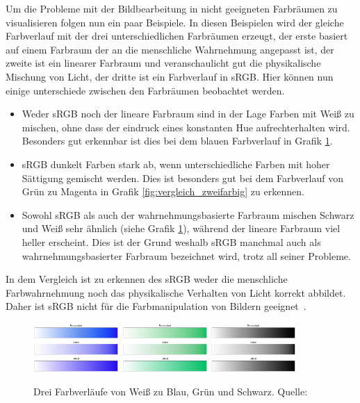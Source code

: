 \documentclass[12pt, a4paper, ngerman]{article}
\begin{document}
Um die Probleme mit der Bildbearbeitung in nicht geeigneten Farbräumen zu visualisieren folgen nun ein paar Beispiele. 
In diesen Beispielen wird der gleiche Farbverlauf mit der drei unterschiedlichen Farbräumen erzeugt, 
der erste basiert auf einem Farbraum der an die menschliche Wahrnehmung angepasst ist, 
der zweite ist ein linearer Farbraum und veranschaulicht gut die physikalische Mischung von Licht, 
der dritte ist ein Farbverlauf in sRGB.
Hier können nun einige unterschiede zwischen den Farbräumen beobachtet werden.
\begin{itemize}
  \item Weder sRGB noch der lineare Farbraum sind in der Lage Farben mit Weiß zu mischen, ohne dass der eindruck eines konstanten Hue aufrechterhalten wird. Besonders gut erkennbar ist dies bei dem blauen Farbverlauf in Grafik \ref{fig:vergleich_white}.
  \item sRGB dunkelt Farben stark ab, wenn unterschiedliche Farben mit hoher Sättigung gemischt werden. Dies ist besonders gut bei dem Farbverlauf von Grün zu Magenta in Grafik \ref{fig:vergleich_zweifarbig} zu erkennen.
  \item Sowohl sRGB als auch der wahrnehmungsbasierte Farbraum mischen Schwarz und Weiß sehr ähnlich (siehe Grafik \ref{fig:vergleich_white}), während der lineare Farbraum viel heller erscheint. Dies ist der Grund weshalb sRGB manchmal auch als wahrnehmungsbasierter Farbraum bezeichnet wird, trotz all seiner Probleme.
\end{itemize}
In dem Vergleich ist zu erkennen des sRGB weder die menschliche Farbwahrnehmung 
noch das physikalische Verhalten von Licht korrekt abbildet.
Daher ist sRGB nicht für die Farbmanipulation von Bildern geeignet~\cite{Ottosson_2020}.

\begin{figure}
  \centering
  \includegraphics[width=0.29\textwidth]{Grafiken/Farbverlauf/whiteblue.png}
  \includegraphics[width=0.29\textwidth]{Grafiken/Farbverlauf/whitegreen.png}
  \includegraphics[width=0.29\textwidth]{Grafiken/Farbverlauf/whiteblack.png}
  \caption{Drei Farbverläufe von Weiß zu Blau, Grün und Schwarz. Quelle:~\cite{Ottosson_2020}}
  \label{fig:vergleich_white}
\end{figure}
\end{document}
